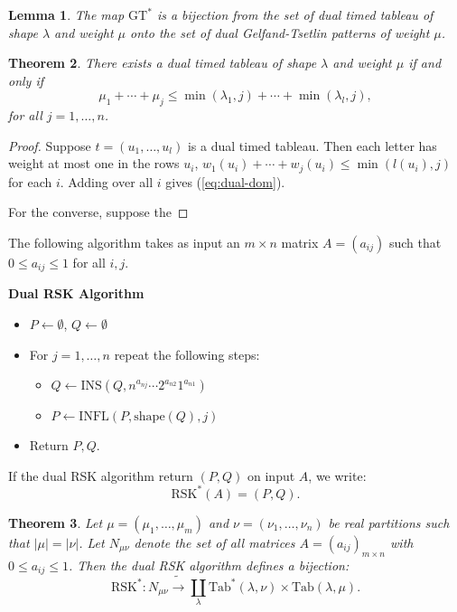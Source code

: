 \documentclass[12pt]{amsart}
\newcommand{\ins}{\mathrm{INS}}
\newcommand{\ttab}{\mathrm{Tab}}
\newcommand{\ot}{\leftarrow}
\newcommand{\infl}{\mathrm{INFL}}
\newcommand{\shape}{\mathrm{shape}}
\newcommand{\rsk}{\mathrm{RSK}}
\newcommand{\GT}{\mathrm{GT}}
\newtheorem{theorem}{Theorem}
\newtheorem{lemma}[theorem]{Lemma}
\theoremstyle{definition}
\begin{document}
\begin{lemma}
  The map $\GT^*$ is a bijection from the set of dual timed tableau of shape $\lambda$ and weight $\mu$ onto the set of dual Gelfand-Tsetlin patterns of weight $\mu$.
\end{lemma}
\begin{theorem}
  There exists a dual timed tableau of shape $\lambda$ and weight $\mu$ if and only if
  \begin{equation}
    \label{eq:dual-dom}
    \mu_1+\dotsb + \mu_j \leq \min(\lambda_1,j) + \dotsb + \min(\lambda_l,j),
  \end{equation}
  for all $j=1,\dotsc,n$.
\end{theorem}
\begin{proof}
  Suppose $t=(u_1,\dotsc,u_l)$ is a dual timed tableau.
  Then each letter has weight at most one in the rows $u_i$, $w_1(u_i)+\dotsb + w_j(u_i)\leq \min(l(u_i), j)$ for each $i$.
  Adding over all $i$ gives (\ref{eq:dual-dom}).

  For the converse, suppose the 
\end{proof}
The following algorithm takes as input an $m\times n$ matrix $A=(a_{ij})$ such that $0\leq a_{ij}\leq 1$ for all $i,j$.
\begin{center}
  \textbf{Dual RSK Algorithm}
  \begin{itemize}
  \item $P\ot \emptyset$, $Q\ot\emptyset$
  \item For $j=1,\dotsc, n$ repeat the following steps:
    \begin{itemize}
    \item $Q\ot \ins(Q, n^{a_{nj}}\dotsb 2^{a_{n2}}1^{a_{n1}})$
    \item $P\ot \infl(P, \shape(Q), j)$
    \end{itemize}
  \item Return $P, Q$.
  \end{itemize}
\end{center}
If the dual RSK algorithm return $(P, Q)$ on input $A$, we write:
\begin{displaymath}
  \rsk^*(A) = (P, Q).
\end{displaymath}
\begin{theorem}
  Let $\mu=(\mu_1,\dotsc,\mu_m)$ and $\nu=(\nu_1,\dotsc,\nu_n)$ be real partitions such that $|\mu|=|\nu|$.
  Let $N_{\mu\nu}$ denote the set of all matrices $A=(a_{ij})_{m\times n}$ with $0\leq a_{ij}\leq 1$.
  Then the dual RSK algorithm defines a bijection:
  \begin{displaymath}
    \rsk^*: N_{\mu\nu}\tilde\to \coprod_\lambda \ttab^*(\lambda,\nu)\times \ttab(\lambda,\mu). 
  \end{displaymath}
\end{theorem}
\end{document}
